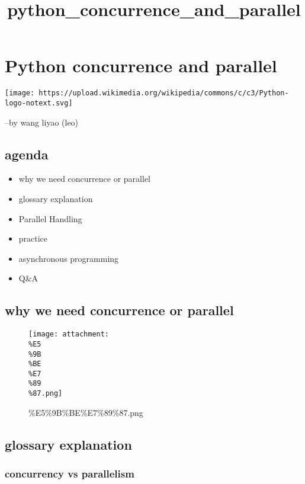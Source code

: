 \documentclass[11pt]{article}
\title{python\_concurrence\_and\_parallel}
\makeatletter
\def\maxwidth{\ifdim\Gin@nat@width>\linewidth\linewidth
    \else\Gin@nat@width\fi}
\let\Oldincludegraphics\includegraphics
\renewcommand{\includegraphics}[1]{\Oldincludegraphics[width=.8\maxwidth]{#1}}
\providecommand{\tightlist}{%
      \setlength{\itemsep}{0pt}\setlength{\parskip}{0pt}}
\makeatother
\begin{document}
    
    
    \maketitle
    
    

    
    \hypertarget{python-concurrence-and-parallel}{%
\section{Python concurrence and
parallel}\label{python-concurrence-and-parallel}}

\texttt{[image: https://upload.wikimedia.org/wikipedia/commons/c/c3/Python-logo-notext.svg]}

--by wang liyao (leo)

    \hypertarget{agenda}{%
\subsection{agenda}\label{agenda}}

\begin{itemize}
\tightlist
\item
  why we need concurrence or parallel
\item
  glossary explanation
\item
  Parallel Handling
\item
  practice
\item
  asynchronous programming
\item
  Q\&A
\end{itemize}

    \hypertarget{why-we-need-concurrence-or-parallel}{%
\subsection{why we need concurrence or
parallel}\label{why-we-need-concurrence-or-parallel}}

\begin{figure}
\centering
\texttt{[image: attachment:\\\%E5\\\%9B\\\%BE\\\%E7\\\%89\\\%87.png]}
\caption{\%E5\%9B\%BE\%E7\%89\%87.png}
\end{figure}

    \hypertarget{glossary-explanation}{%
\subsection{glossary explanation}\label{glossary-explanation}}

    \hypertarget{concurrency-vs-parallelism}{%
\subsubsection{concurrency vs
parallelism}\label{concurrency-vs-parallelism}}
\end{document}
